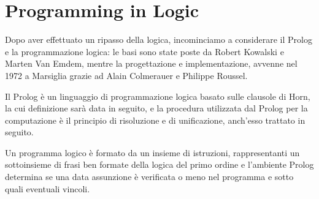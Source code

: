 \chapter{Programming in Logic}
Dopo aver effettuato un ripasso della logica, incominciamo a considerare il Prolog e la programmazione logica:
le basi sono state poste da Robert Kowalski e Marten Van Emdem, mentre la progettazione e implementazione,
avvenne nel 1972 a Marsiglia grazie ad Alain Colmerauer e Philippe Roussel.

Il Prolog è un linguaggio di programmazione logica basato sulle clausole di Horn, la cui definizione sarà data in seguito,
e la procedura utilizzata dal Prolog per la computazione è il principio di risoluzione e di unificazione, anch'esso trattato in seguito.

Un programma logico è formato da un insieme di istruzioni, rappresentanti un sottoinsieme di frasi ben formate della logica del primo ordine
e l'ambiente Prolog determina se una data assunzione è verificata o meno nel programma e sotto quali eventuali vincoli.

